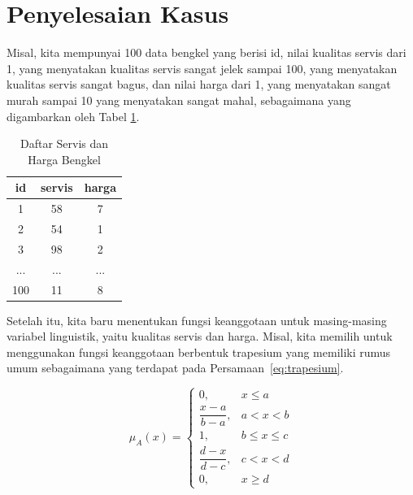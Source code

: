 \documentclass[12pt,a4paper]{article}
\theoremstyle{remark}
\begin{document}
\section{Penyelesaian Kasus}
Misal, kita mempunyai 100 data bengkel yang berisi id, nilai kualitas servis dari 1, yang menyatakan kualitas servis sangat jelek sampai 100, yang menyatakan kualitas servis sangat bagus, dan nilai harga dari 1, yang menyatakan sangat murah sampai 10 yang menyatakan sangat mahal, sebagaimana yang digambarkan oleh Tabel \ref{tab:servis_harga}.

\begin{table}[H]
    \centering
    \caption{Daftar Servis dan Harga Bengkel}
    \label{tab:servis_harga}
    \begin{tabular}{|c|c|c|}
        \hline
        \textbf{id} & \textbf{servis} & \textbf{harga} \\ \hline
        1           & 58              & 7              \\
        2           & 54              & 1              \\
        3           & 98              & 2              \\
        ...         & ...             & ...            \\
        100         & 11              & 8              \\
        \hline
    \end{tabular}
\end{table}

Setelah itu, kita baru menentukan fungsi keanggotaan untuk masing-masing variabel linguistik, yaitu kualitas servis dan harga. Misal, kita memilih untuk menggunakan fungsi keanggotaan berbentuk trapesium yang memiliki rumus umum sebagaimana yang terdapat pada Persamaan~\ref{eq:trapesium}.

\begin{equation}
    \label{eq:trapesium}
    \mu_A(x) =
    \begin{cases}
        0,                    & x \leq a        \\
        \dfrac{x - a}{b - a}, & a < x < b       \\
        1,                    & b \leq x \leq c \\
        \dfrac{d - x}{d - c}, & c < x < d       \\
        0,                    & x \geq d
    \end{cases}
\end{equation}
\end{document}
